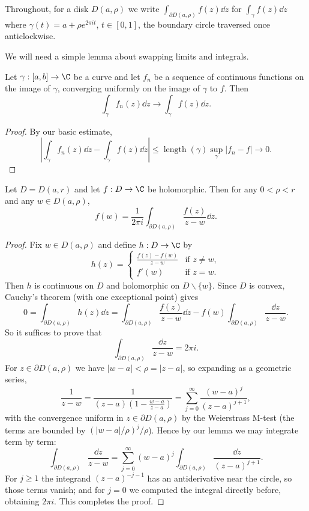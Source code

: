 Throughout, for a disk $D(a, \rho)$ we write $\int_{\partial D(a, \rho)} f(z) \dd z$ for $\int_\gamma f(z) \dd z$ where $\gamma(t) = a + \rho e^{2 \pi i t}$, $t \in [0, 1]$, the boundary circle traversed once anticlockwise.

We will need a simple lemma about swapping limits and integrals.

\begin{lemma}
    Let $\gamma: [a, b] \rightarrow \C$ be a curve and let $f_n$ be a sequence of continuous functions on the image of $\gamma$, converging uniformly on the image of $\gamma$ to $f$. Then
    $$
    \int_\gamma f_n(z) \dd z \rightarrow \int_\gamma f(z) \dd z.
    $$
\end{lemma}
\begin{proof}
    By our basic estimate,
    \[
    \left|\int_\gamma f_n(z) \dd z - \int_\gamma f(z) \dd z \right| \leq \operatorname{length}(\gamma) \sup_{\gamma} |f_n - f| \rightarrow 0.
    \]
\end{proof}

\begin{theorem}
    Let $D = D(a, r)$ and let $f: D \rightarrow \C$ be holomorphic. Then for any $0 < \rho < r$ and any $w \in D(a, \rho)$,
    $$
    f(w) = \frac{1}{2 \pi i} \int_{\partial D(a, \rho)} \frac{f(z)}{z - w} \dd z.
    $$
\end{theorem}
\begin{proof}
    Fix $w \in D(a, \rho)$ and define $h: D \rightarrow \C$ by
    $$
    h(z) = \begin{cases}
        \frac{f(z) - f(w)}{z - w} &\mbox{if } z \neq w, \\
        f'(w) &\mbox{if } z = w.
       \end{cases}
    $$
    Then $h$ is continuous on $D$ and holomorphic on $D \backslash \{w\}$. Since $D$ is convex, Cauchy's theorem (with one exceptional point) gives
    $$
    0 = \int_{\partial D(a, \rho)} h(z) \dd z = \int_{\partial D(a, \rho)} \frac{f(z)}{z - w} \dd z - f(w)\int_{\partial D(a, \rho)} \frac{\dd z}{z - w}.
    $$
    So it suffices to prove that
    $$
    \int_{\partial D(a, \rho)} \frac{\dd z}{z - w} = 2 \pi i.
    $$
    For $z \in \partial D(a, \rho)$ we have $|w - a| < \rho = |z - a|$, so expanding as a geometric series,
    $$
    \frac{1}{z - w} = \frac{1}{(z - a)\left(1 - \frac{w - a}{z - a}\right)} = \sum_{j = 0}^{\infty} \frac{(w - a)^j}{(z - a)^{j + 1}},
    $$
    with the convergence uniform in $z \in \partial D(a, \rho)$ by the Weierstrass M-test (the terms are bounded by $(|w - a|/\rho)^j / \rho$). Hence by our lemma we may integrate term by term:
    $$
    \int_{\partial D(a, \rho)} \frac{\dd z}{z - w} = \sum_{j = 0}^{\infty} (w - a)^j \int_{\partial D(a, \rho)} \frac{\dd z}{(z - a)^{j + 1}}.
    $$
    For $j \geq 1$ the integrand $(z - a)^{-j - 1}$ has an antiderivative near the circle, so those terms vanish; and for $j = 0$ we computed the integral directly before, obtaining $2 \pi i$. This completes the proof.
\end{proof}

